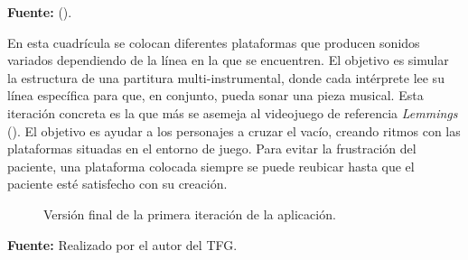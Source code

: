 \begin{center}
	\textbf{Fuente:} \citeauthor{AUTODIDACTA:2020} (\citeyear{AUTODIDACTA:2020}).
\end{center}

En esta cuadrícula se colocan diferentes plataformas que producen sonidos variados dependiendo de la línea en la que se encuentren. El objetivo es simular la estructura de una partitura multi-instrumental, donde cada intérprete lee su línea específica para que, en conjunto, pueda sonar una pieza musical. Esta iteración concreta es la que más se asemeja al videojuego de referencia \textit{Lemmings} (\cite{LEMMINGS:1991}). El objetivo es ayudar a los personajes a cruzar el vacío, creando ritmos con las plataformas situadas en el entorno de juego. Para evitar la frustración del paciente, una plataforma colocada siempre se puede reubicar hasta que el paciente esté satisfecho con su creación.

\begin{figure}[h!]
	\centering
	\hfil
	\caption{Versión final de la primera iteración de la aplicación.}
	\label{fig:Grid}
	\vspace{-18pt}
\end{figure}

\begin{center}
	\textbf{Fuente:} Realizado por el autor del TFG.
\end{center}

